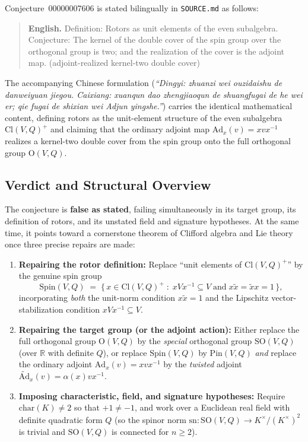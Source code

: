 \documentclass[11pt]{article}
\theoremstyle{definition}
\theoremstyle{remark}
\newcommand{\Cl}{\mathrm{Cl}}
\newcommand{\Spin}{\mathrm{Spin}}
\newcommand{\Pin}{\mathrm{Pin}}
\newcommand{\Ad}{\mathrm{Ad}}
\newcommand{\tAd}{\widetilde{\mathrm{Ad}}}
\newcommand{\SO}{\mathrm{SO}}
\newcommand{\Orth}{\mathrm{O}}
\newcommand{\sn}{\mathrm{sn}}
\begin{document}
Conjecture~00000007606 is stated bilingually in \texttt{SOURCE.md} as follows:
\begin{quote}
\textbf{English.} Definition: Rotors as unit elements of the even subalgebra. Conjecture: The kernel of the double cover of the spin group over the orthogonal group is two; and the realization of the cover is the adjoint map. (adjoint-realized kernel-two double cover)
\end{quote}
The accompanying Chinese formulation (\emph{``Dingyi: zhuanzi wei ouzidaishu de danweiyuan jiegou. Caixiang: xuanqun dao zhengjiaoqun de shuangfugai de he wei er; qie fugai de shixian wei Adjun yingshe.''}) carries the identical mathematical content, defining rotors as the unit-element structure of the even subalgebra $\Cl(V,Q)^+$ and claiming that the ordinary adjoint map $\Ad_x(v) = x v x^{-1}$ realizes a kernel-two double cover from the spin group onto the full orthogonal group $\Orth(V,Q)$.

\subsection{Verdict and Structural Overview}

The conjecture is \textbf{false as stated}, failing simultaneously in its target group, its definition of rotors, and its unstated field and signature hypotheses. At the same time, it points toward a cornerstone theorem of Clifford algebra and Lie theory once three precise repairs are made:
\begin{enumerate}
\item[(i)] \textbf{Repairing the rotor definition:} Replace ``unit elements of $\Cl(V,Q)^+$'' by the genuine spin group
\[
\Spin(V,Q) \;=\; \bigl\{\, x \in \Cl(V,Q)^+ \;:\; x V x^{-1} \subseteq V \;\text{and}\; x \widetilde{x} = \widetilde{x} x = 1 \,\bigr\},
\]
incorporating \emph{both} the unit-norm condition $x \widetilde{x} = 1$ and the Lipschitz vector-stabilization condition $x V x^{-1} \subseteq V$.
\item[(ii)] \textbf{Repairing the target group (or the adjoint action):} Either replace the full orthogonal group $\Orth(V,Q)$ by the \emph{special} orthogonal group $\SO(V,Q)$ (over $\mathbb{R}$ with definite $Q$), or replace $\Spin(V,Q)$ by $\Pin(V,Q)$ \emph{and} replace the ordinary adjoint $\Ad_x(v) = x v x^{-1}$ by the \emph{twisted} adjoint $\tAd_x(v) = \alpha(x) v x^{-1}$.
\item[(iii)] \textbf{Imposing characteristic, field, and signature hypotheses:} Require $\mathrm{char}(K) \ne 2$ so that $+1 \ne -1$, and work over a Euclidean real field with definite quadratic form $Q$ (so the spinor norm $\sn : \SO(V,Q) \to K^\times / (K^\times)^2$ is trivial and $\SO(V,Q)$ is connected for $n \ge 2$).
\end{enumerate}
\end{document}
